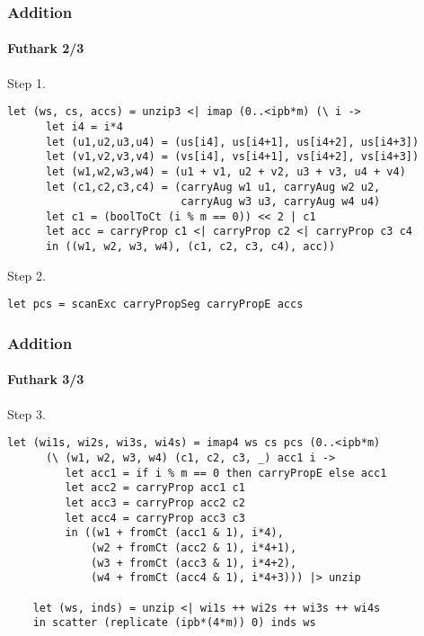 \begin{frame}[fragile]
  \frametitle{Addition}
  \framesubtitle{Futhark 2/3}
  Step 1.
\begin{lstlisting}[language=futhark,gobble=4,basicstyle=\scriptsize,frame=single,firstnumber=16]
    let (ws, cs, accs) = unzip3 <| imap (0..<ipb*m) (\ i ->
      let i4 = i*4
      let (u1,u2,u3,u4) = (us[i4], us[i4+1], us[i4+2], us[i4+3])
      let (v1,v2,v3,v4) = (vs[i4], vs[i4+1], vs[i4+2], vs[i4+3])
      let (w1,w2,w3,w4) = (u1 + v1, u2 + v2, u3 + v3, u4 + v4)
      let (c1,c2,c3,c4) = (carryAug w1 u1, carryAug w2 u2,
                           carryAug w3 u3, carryAug w4 u4)
      let c1 = (boolToCt (i % m == 0)) << 2 | c1
      let acc = carryProp c1 <| carryProp c2 <| carryProp c3 c4
      in ((w1, w2, w3, w4), (c1, c2, c3, c4), acc))
\end{lstlisting}
  Step 2.
\begin{lstlisting}[language=futhark,gobble=4,basicstyle=\scriptsize,firstnumber=27,frame=single]
    let pcs = scanExc carryPropSeg carryPropE accs
\end{lstlisting}
\end{frame}

\begin{frame}[fragile]
  \frametitle{Addition}
  \framesubtitle{Futhark 3/3}
  Step 3.
\begin{lstlisting}[language=futhark,gobble=4,basicstyle=\scriptsize,firstnumber=28,frame=single]
    let (wi1s, wi2s, wi3s, wi4s) = imap4 ws cs pcs (0..<ipb*m)
      (\ (w1, w2, w3, w4) (c1, c2, c3, _) acc1 i ->
         let acc1 = if i % m == 0 then carryPropE else acc1
         let acc2 = carryProp acc1 c1
         let acc3 = carryProp acc2 c2
         let acc4 = carryProp acc3 c3
         in ((w1 + fromCt (acc1 & 1), i*4),
             (w2 + fromCt (acc2 & 1), i*4+1),
             (w3 + fromCt (acc3 & 1), i*4+2),
             (w4 + fromCt (acc4 & 1), i*4+3))) |> unzip

    let (ws, inds) = unzip <| wi1s ++ wi2s ++ wi3s ++ wi4s
    in scatter (replicate (ipb*(4*m)) 0) inds ws
\end{lstlisting}
\end{frame}

